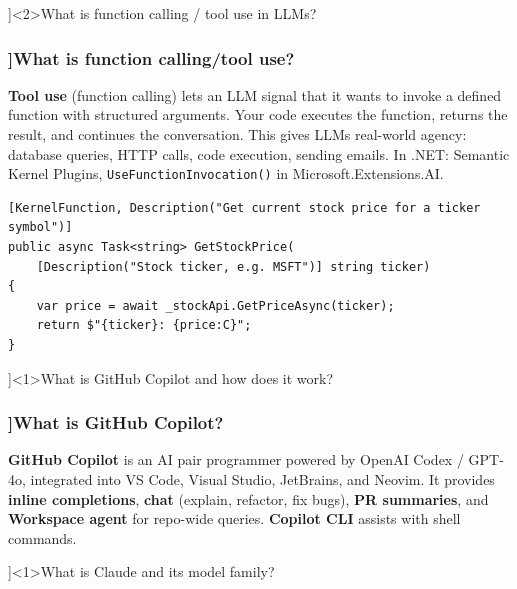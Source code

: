 \QuestionSlide[\CategoryBadge[AiToolColor!20]{AI Tools \& LLMs}]<2>{What is function calling / tool use in LLMs?}

\begin{frame}[fragile]
  \frametitle{\AnswerTitle[\CategoryBadge[AiToolColor!20]{AI Tools \& LLMs}]{What is function calling/tool use?}}

  {\footnotesize
  \textbf{Tool use} (function calling) lets an LLM signal that it wants to invoke a defined function with structured arguments. Your code executes the function, returns the result, and continues the conversation. This gives LLMs real-world agency: database queries, HTTP calls, code execution, sending emails. In .NET: Semantic Kernel Plugins, \texttt{UseFunctionInvocation()} in Microsoft.Extensions.AI.
  }

  \begin{verbatim}
[KernelFunction, Description("Get current stock price for a ticker symbol")]
public async Task<string> GetStockPrice(
    [Description("Stock ticker, e.g. MSFT")] string ticker)
{
    var price = await _stockApi.GetPriceAsync(ticker);
    return $"{ticker}: {price:C}";
}
  \end{verbatim}
\end{frame}

\QuestionSlide[\CategoryBadge[AiToolColor!20]{AI Tools \& LLMs}]<1>{What is GitHub Copilot and how does it work?}

\begin{frame}[fragile]
  \frametitle{\AnswerTitle[\CategoryBadge[AiToolColor!20]{AI Tools \& LLMs}]{What is GitHub Copilot?}}

  {\footnotesize
  \textbf{GitHub Copilot} is an AI pair programmer powered by OpenAI Codex / GPT-4o, integrated into VS Code, Visual Studio, JetBrains, and Neovim. It provides \textbf{inline completions}, \textbf{chat} (explain, refactor, fix bugs), \textbf{PR summaries}, and \textbf{Workspace agent} for repo-wide queries. \textbf{Copilot CLI} assists with shell commands.
  }
\end{frame}

\QuestionSlide[\CategoryBadge[AiToolColor!20]{AI Tools \& LLMs}]<1>{What is Claude and its model family?}

